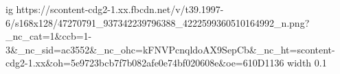  
 
 
 
 
\ifcmt
  ig https://scontent-cdg2-1.xx.fbcdn.net/v/t39.1997-6/s168x128/47270791_937342239796388_4222599360510164992_n.png?_nc_cat=1&ccb=1-3&_nc_sid=ac3552&_nc_ohc=kFNVPcnqldoAX9SepCb&_nc_ht=scontent-cdg2-1.xx&oh=5e9723bcb7f7b082afe0e74bf020608e&oe=610D1136
  width 0.1
\fi
